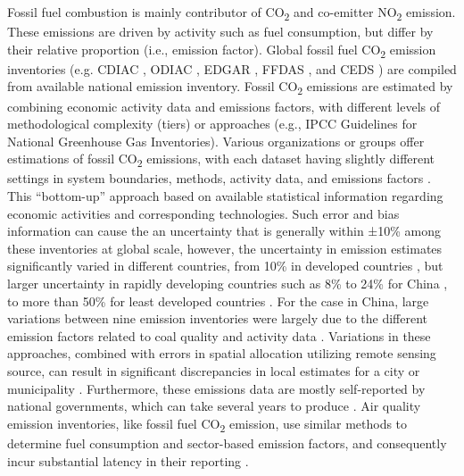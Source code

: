 Fossil fuel combustion is mainly contributor of CO\textsubscript{2} and co-emitter NO\textsubscript{2} emission. These emissions are driven by activity such as fuel consumption, but differ by their relative proportion (i.e., emission factor)\citep{miyazaki2023predictability}. Global fossil fuel CO\textsubscript{2} emission inventories (e.g. CDIAC \citep{andres2012synthesis}, ODIAC \citep{oda2011very, oda2018open}, EDGAR \citep{crippa2020high}, FFDAS \citep{asefi2014multiyear}, and CEDS \citep{hoesly2018historical}) are compiled from available national emission inventory. Fossil CO\textsubscript{2} emissions are estimated by combining economic activity data and emissions factors, with different levels of methodological complexity (tiers) or approaches (e.g., IPCC Guidelines for National Greenhouse Gas Inventories). Various organizations or groups offer estimations of fossil CO\textsubscript{2} emissions, with each dataset having slightly different settings in system boundaries, methods, activity data, and emissions factors \citep{andrew2020comparison}. This “bottom-up” approach based on available statistical information regarding economic activities and corresponding technologies. Such error and bias information can cause the an uncertainty that is generally within ±10\% among these inventories at global scale, however, the uncertainty in emission estimates significantly varied in different countries, from 10\% in developed countries \citep{essd-11-1783-2019}, but larger uncertainty in rapidly developing countries such as 8\% to 24\% for China \citep{han2020evaluating, marland2008uncertainties}, to more than 50\% for least developed countries \citep{andres2016gridded, essd-11-1783-2019, oda2018open}. For the case in China, large variations between nine emission inventories were largely due to the different emission factors related to coal quality and activity data \citep{han2020evaluating,miyazaki2023predictability}. Variations in these approaches, combined with errors in spatial allocation utilizing remote sensing source, can result in significant discrepancies in local estimates for a city or municipality \citep{oda2019errors, hutchins2017comparison}. Furthermore, these emissions data are mostly self-reported by national governments, which can take several years to produce \citep{marland2008uncertainties}. Air quality emission inventories, like fossil fuel CO\textsubscript{2} emission, use similar methods to determine fuel consumption and sector-based emission factors, and consequently incur substantial latency in their reporting \citep{miyazaki2023predictability}.\par

